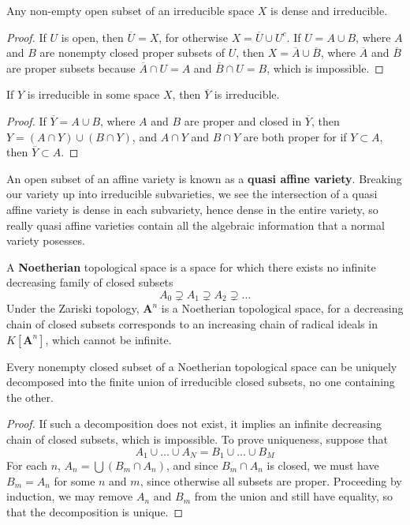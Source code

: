 \begin{theorem}
    Any non-empty open subset of an irreducible space $X$ is dense and irreducible.
\end{theorem}
\begin{proof}
    If $U$ is open, then $\overline{U} = X$, for otherwise $X = \overline{U} \cup U^c$. If $U = A \cup B$, where $A$ and $B$ are nonempty closed proper subsets of $U$, then $X = \overline{A} \cup \overline{B}$, where $\overline{A}$ and $\overline{B}$ are proper subsets because $\overline{A} \cap U = A$ and $\overline{B} \cap U = B$, which is impossible.
\end{proof}

\begin{corollary}
    If $Y$ is irreducible in some space $X$, then $\overline{Y}$ is irreducible.
\end{corollary}
\begin{proof}
    If $\overline{Y} = A \cup B$, where $A$ and $B$ are proper and closed in $\overline{Y}$, then $Y = (A \cap Y) \cup (B \cap Y)$, and $A \cap Y$ and $B \cap Y$ are both proper for if $Y \subset A$, then $\overline{Y} \subset A$.
\end{proof}

An open subset of an affine variety is known as a {\bf quasi affine variety}. Breaking our variety up into irreducible subvarieties, we see the intersection of a quasi affine variety is dense in each subvariety, hence dense in the entire variety, so really quasi affine varieties contain all the algebraic information that a normal variety posesses.

A {\bf Noetherian} topological space is a space for which there exists no infinite decreasing family of closed subsets
%
\[ A_0 \supsetneq A_1 \supsetneq A_2 \supsetneq \dots \]
%
Under the Zariski topology, $\mathbf{A}^n$ is a Noetherian topological space, for a decreasing chain of closed subsets corresponds to an increasing chain of radical ideals in $K[\mathbf{A}^n]$, which cannot be infinite.

\begin{theorem}
    Every nonempty closed subset of a Noetherian topological space can be uniquely decomposed into the finite union of irreducible closed subsets, no one containing the other.
\end{theorem}
\begin{proof}
    If such a decomposition does not exist, it implies an infinite decreasing chain of closed subsets, which is impossible. To prove uniqueness, suppose that
    \[ A_1 \cup \dots \cup A_N = B_1 \cup \dots \cup B_M \]
    For each $n$, $A_n = \bigcup (B_m \cap A_n)$, and since $B_m \cap A_n$ is closed, we must have $B_m = A_n$ for some $n$ and $m$, since otherwise all subsets are proper. Proceeding by induction, we may remove $A_n$ and $B_m$ from the union and still have equality, so that the decomposition is unique.
\end{proof}

